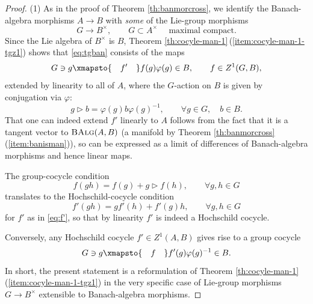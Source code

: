 \documentclass[pdftex]{sigma}
\numberwithin{equation}{section}
\newcommand{\cat}[1]{\text{\sc #1}}
\begin{document}
\begin{proof}
(1) As in the proof of Theorem \ref{th:banmorcross}, we identify the Banach-algebra morphisms $A\to B$ with {\it some} of the Lie-group morphisms
 \begin{equation*}
 G\to B^{\times},\qquad G\subset A^{\times}\quad\text{ maximal compact}.
 \end{equation*}
 Since the Lie algebra of $B^{\times}$ is $B$, Theorem \ref{th:cocyle-man-1}\,(\ref{item:cocyle-man-1-tgz1}) shows that \eqref{eq:tgban} consists of the maps
 \begin{equation}\label{eq:f'}
 G\ni g\xmapsto{\quad f'\quad} f(g)\varphi(g)\in B,\qquad f\in Z^1(G,B),
 \end{equation}
 extended by linearity to all of $A$, where the $G$-action on $B$ is given by conjugation via $\varphi$:
 \begin{equation*}
 g\triangleright b = \varphi(g)b\varphi(g)^{-1},\qquad \forall g\in G,\quad b\in B.
 \end{equation*}
 That one can indeed extend $f'$ linearly to $A$ follows from the fact that it is a tangent vector to $\cat{BAlg}(A,B)$ (a manifold by Theorem \ref{th:banmorcross}\,(\ref{item:banisman})), so can be expressed as a limit of differences of Banach-algebra morphisms and hence linear maps.

 The group-cocycle condition
 \begin{equation*}
 f(gh) = f(g) + g\triangleright f(h),\qquad \forall g,h\in G
 \end{equation*}
 translates to the Hochschild-cocycle condition
 \begin{equation*}
 f'(gh) = gf'(h) + f'(g)h,\qquad \forall g,h\in G
 \end{equation*}
 for $f'$ as in \eqref{eq:f'}, so that by linearity $f'$ is indeed a Hochschild cocycle.

 Conversely, any Hochschild cocycle $f'\in Z^1(A,B)$ gives rise to a group cocycle
 \begin{equation*}
 G\ni g\xmapsto{\quad f\quad} f'(g)\varphi(g)^{-1}\in B.
 \end{equation*}
 In short, the present statement is a reformulation of Theorem \ref{th:cocyle-man-1}\,(\ref{item:cocyle-man-1-tgz1}) in the very specific case of Lie-group morphisms $G\to B^{\times}$ extensible to Banach-algebra morphisms.


\end{proof}
\end{document}

